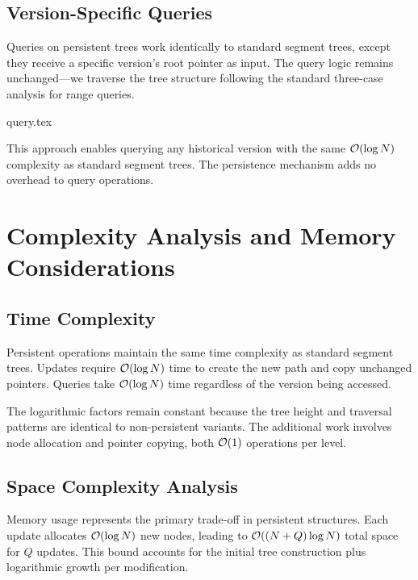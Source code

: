 \subsection{Version-Specific Queries}
Queries on persistent trees work identically to standard segment trees, except they receive a specific version's root pointer as input. The query logic remains unchanged—we traverse the tree structure following the standard three-case analysis for range queries.

\begin{algorithm}
{query.tex}
\end{algorithm}
\vspace{1em}

This approach enables querying any historical version with the same $\mathcal{O}(\log N)$ complexity as standard segment trees. The persistence mechanism adds no overhead to query operations.

\section{Complexity Analysis and Memory Considerations}
\label{sec:complexity_memory}

\subsection{Time Complexity}

Persistent operations maintain the same time complexity as standard segment trees. Updates require $\mathcal{O}(\log N)$ time to create the new path and copy unchanged pointers. Queries take $\mathcal{O}(\log N)$ time regardless of the version being accessed.

The logarithmic factors remain constant because the tree height and traversal patterns are identical to non-persistent variants. The additional work involves node allocation and pointer copying, both $\mathcal{O}(1)$ operations per level.

\subsection{Space Complexity Analysis}

Memory usage represents the primary trade-off in persistent structures. Each update allocates $\mathcal{O}(\log N)$ new nodes, leading to $\mathcal{O}((N + Q) \log N)$ total space for $Q$ updates. This bound accounts for the initial tree construction plus logarithmic growth per modification.



